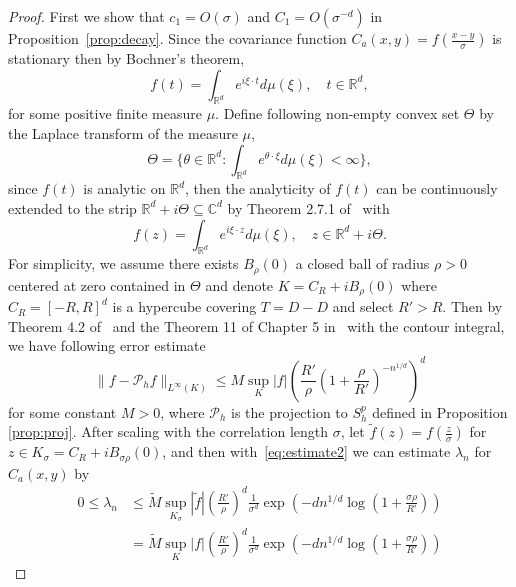 \documentclass[11pt]{amsart}
\begin{document}
\begin{proof}
First we show that $c_1 = O(\sigma)$ and $C_1 = O(\sigma^{-d})$ in Proposition~\ref{prop:decay}. Since the covariance function $C_a(x, y) = f(\frac{x-y}{\sigma})$ is stationary then by Bochner's theorem, 
\begin{equation}
f(t) = \int_{\mathbb{R}^d} e^{i \xi\cdot t} d\mu(\xi),\quad t\in\mathbb{R}^d,
\end{equation}
for some positive finite measure $\mu$. Define following non-empty convex set $\Theta$ by the Laplace transform of the measure $\mu$,
\begin{equation}
\Theta = \{ \theta \in \mathbb{R}^d : \int_{\mathbb{R}^d}  e^{\theta\cdot \xi} d\mu(\xi) < \infty \},
\end{equation}
since $f(t)$ is analytic on $\mathbb{R}^d$, then the analyticity of $f(t)$ can be continuously extended to the strip $\mathbb{R}^d + i \Theta\subseteq \mathbb{C}^d$ by Theorem 2.7.1 of~\cite{lehmann2006testing} with
\begin{equation}
f(z) = \int_{\mathbb{R}^d} e^{i \xi\cdot z} d\mu(\xi),\quad z\in \mathbb{R}^d + i \Theta.
\end{equation}
For simplicity, we assume there exists $B_{\rho}(0)$ a closed ball of radius $\rho > 0$ centered at zero contained in $\Theta$ and denote $K = C_R + i B_{\rho}(0)$ where $C_R = [-R, R]^d$ is a hypercube covering $T = D-D$ and select $R' > R$. Then by Theorem 4.2 of~\cite{trefethen2017multivariate} and the Theorem 11 of Chapter 5 in~\cite{bochner1948several} with the contour integral, we have following error estimate
\begin{equation}\label{eq:estimate2}
\|f - \mathcal{P}_h f\|_{L^{\infty}(K)}\le M \sup_{K} |f|\left(\frac{ R'}{ \rho}(1 +  \frac{\rho}{R'})^{-n^{1/d}}\right)^d
\end{equation}
for some constant $M > 0$, where $\mathcal{P}_h$ is the projection to $S_h^p$ defined in Proposition \ref{prop:proj}. After scaling with the correlation length $\sigma$, let $\tilde{f}(z) = f(\frac{z}{\sigma})$ for $z\in K_{\sigma} = C_R + i B_{\sigma\rho}(0)$, and then with~\eqref{eq:estimate2} we can estimate $\lambda_n$ for $C_a(x, y)$ by 
\begin{equation}
\begin{aligned}
0 \le \lambda_n &\le \tilde{M} \sup_{K_{\sigma}} |\tilde{f}|\left( \frac{R'}{\rho}\right)^d \frac{1}{ \sigma^d} \exp\left( -dn^{1/d}\log(1 +  \frac{\sigma\rho}{R'})\right)\\&= \tilde{M} \sup_{K} |f|\left( \frac{R'}{\rho}\right)^d \frac{1}{ \sigma^d} \exp\left( -dn^{1/d}\log(1 +  \frac{\sigma\rho}{R'})\right)

\end{aligned}
\end{equation}
\end{proof}
\end{document}
